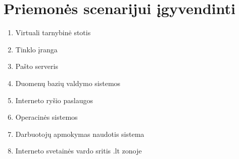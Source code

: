 \section{Priemonės scenarijui įgyvendinti}
\begin{enumerate}
	\item Virtuali tarnybinė stotis
	\item Tinklo įranga
	\item Pašto serveris
	\item Duomenų bazių valdymo sistemos
	\item Interneto ryšio paslaugos
	\item Operacinės sistemos
	\item Darbuotojų apmokymas naudotis sistema
	\item Interneto svetainės vardo sritis .lt zonoje
\end{enumerate}
